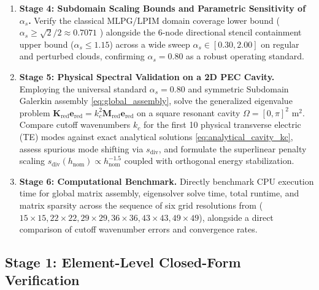 \documentclass[VANCOUVER,Times1COL]{WileyNJD-v5}
\begin{document}
\begin{enumerate}
\begin{equation}
\begin{aligned}
                  |\vec{E}^h - \vec{E}^*|_{H(\mathbf{curl})} \equiv \|(\nabla \times \vec{E}^h)_z - (\nabla \times \vec{E}^*)_z\|_{L^2} & \sim \mathcal{O}(h_{\mathrm{nom}}).
              \end{aligned}
          \end{equation}
    \item \textbf{Stage 4: Subdomain Scaling Bounds and Parametric Sensitivity of $\alpha_s$.} Verify the classical MLPG/LPIM domain coverage lower bound ($\alpha_s \ge \sqrt{2}/2 \approx 0.7071$ \cite{atluri2002meshless, liu2009mesh}) alongside the 6-node directional stencil containment upper bound ($\alpha_s \le 1.15$) across a wide sweep $\alpha_s \in [0.30, 2.00]$ on regular and perturbed clouds, confirming $\alpha_s = 0.80$ as a robust operating standard.
    \item \textbf{Stage 5: Physical Spectral Validation on a 2D PEC Cavity.} Employing the universal standard $\alpha_s = 0.80$ and symmetric Subdomain Galerkin assembly \eqref{eq:global_assembly}, solve the generalized eigenvalue problem $\mathbf{K}_{\mathrm{red}} \mathbf{e}_{\mathrm{red}} = k_c^2 \mathbf{M}_{\mathrm{red}} \mathbf{e}_{\mathrm{red}}$ on a square resonant cavity $\Omega = [0, \pi]^2\text{ m}^2$. Compare cutoff wavenumbers $k_c$ for the first 10 physical transverse electric (TE) modes against exact analytical solutions \eqref{eq:analytical_cavity_kc}, assess spurious mode shifting via $s_{\mathrm{div}}$, and formulate the superlinear penalty scaling $s_{\mathrm{div}}(h_{\mathrm{nom}}) \propto h_{\mathrm{nom}}^{-1.5}$ coupled with orthogonal energy stabilization.
    \item \textbf{Stage 6: Computational Benchmark.} Directly benchmark CPU execution time for global matrix assembly, eigensolver solve time, total runtime, and matrix sparsity across the sequence of six grid resolutions from \cite{stable_vnmm2d_2026} ($15 \times 15, 22 \times 22, 29 \times 29, 36 \times 36, 43 \times 43, 49 \times 49$), alongside a direct comparison of cutoff wavenumber errors and convergence rates.
\end{enumerate}

\subsection{Stage 1: Element-Level Closed-Form Verification}
\label{subsec:stage1_results}
\end{document}
